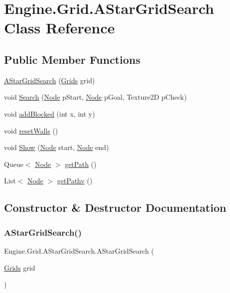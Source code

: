 \hypertarget{a00398}{}\section{Engine.\+Grid.\+A\+Star\+Grid\+Search Class Reference}
\label{a00398}
\subsection*{Public Member Functions}
\begin{DoxyCompactItemize}
\item 
\hyperlink{a00398_a29a934525f624e8c6ee7693f04df61c0}{A\+Star\+Grid\+Search} (\hyperlink{a00406}{Grids} grid)
\item 
void \hyperlink{a00398_a9b15ad7367bb5421108a9232d4c4954c}{Search} (\hyperlink{a00414}{Node} p\+Start, \hyperlink{a00414}{Node} p\+Goal, Texture2D p\+Check)
\item 
void \hyperlink{a00398_a1d4e74e3564bffa81262c73e2ecfcdfc}{add\+Blocked} (int x, int y)
\item 
void \hyperlink{a00398_a0e6a0e9cbcdaccff905216da631fad56}{reset\+Walls} ()
\item 
void \hyperlink{a00398_a0376f68fb9f4d45d11be4855fece5e56}{Show} (\hyperlink{a00414}{Node} start, \hyperlink{a00414}{Node} end)
\item 
Queue$<$ \hyperlink{a00414}{Node} $>$ \hyperlink{a00398_a8d3cb5019defd8e526d0c1111bcf2986}{get\+Path} ()
\item 
List$<$ \hyperlink{a00414}{Node} $>$ \hyperlink{a00398_a47ea78e4c6a2d333de9373b62543cbc7}{get\+Pathv} ()
\end{DoxyCompactItemize}


\subsection{Constructor \& Destructor Documentation}
\mbox{\label{a00398_a29a934525f624e8c6ee7693f04df61c0}} 
\subsubsection{\texorpdfstring{A\+Star\+Grid\+Search()}{AStarGridSearch()}}
{\footnotesize\ttfamily Engine.\+Grid.\+A\+Star\+Grid\+Search.\+A\+Star\+Grid\+Search (\begin{DoxyParamCaption}\item[{\hyperlink{a00406}{Grids}}]{grid }\end{DoxyParamCaption})\hspace{0.3cm}{\ttfamily [inline]}}



